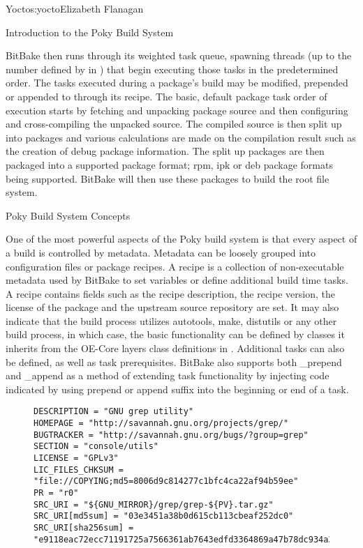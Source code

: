 \begin{aosachapter}{Yocto}{s:yocto}{Elizabeth Flanagan}
\begin{aosasect1}{Introduction to the Poky Build System}

BitBake then runs through its weighted task queue, spawning threads
(up to the number defined by  in
) that begin executing those tasks in the
predetermined order. The tasks executed during a package's build may
be modified, prepended or appended to through its recipe. The basic,
default package task order of execution starts by fetching and
unpacking package source and then configuring and cross-compiling the
unpacked source. The compiled source is then split up into packages
and various calculations are made on the compilation result such as
the creation of debug package information.  The split up packages are
then packaged into a supported package format; rpm, ipk or deb package
formats being supported. BitBake will then use these packages to build
the root file system.

\begin{aosasect2}{Poky Build System Concepts}

One of the most powerful aspects of the
Poky build system is that every aspect of a build is controlled by
metadata. Metadata can be loosely grouped into configuration files or
package recipes. A recipe is a
collection of non-executable
metadata used by BitBake to set variables or define additional build
time tasks. A recipe contains fields such as the recipe description,
the recipe version, the license of the package and the upstream
source repository are set. It may also indicate
that the build process utilizes autotools, make, distutils or any
other build process, in which case, the basic functionality can be
defined by classes it inherits from
the OE-Core layers class definitions in .
Additional tasks can also be
defined, as well as task prerequisites. BitBake
also supports both \_prepend
and \_append as a method of extending task functionality by injecting
code indicated by using prepend or append suffix into the beginning
or end of a task.

\begin{figure}
\begin{verbatim}
DESCRIPTION = "GNU grep utility"
HOMEPAGE = "http://savannah.gnu.org/projects/grep/"
BUGTRACKER = "http://savannah.gnu.org/bugs/?group=grep"
SECTION = "console/utils"
LICENSE = "GPLv3"
LIC_FILES_CHKSUM = "file://COPYING;md5=8006d9c814277c1bfc4ca22af94b59ee"
PR = "r0"
SRC_URI = "${GNU_MIRROR}/grep/grep-${PV}.tar.gz"
SRC_URI[md5sum] = "03e3451a38b0d615cb113cbeaf252dc0"
SRC_URI[sha256sum] = "e9118eac72ecc71191725a7566361ab7643edfd3364869a47b78dc934a357970"


\end{verbatim}
\end{figure}
\end{aosasect2}
\end{aosasect1}
\end{aosachapter}
